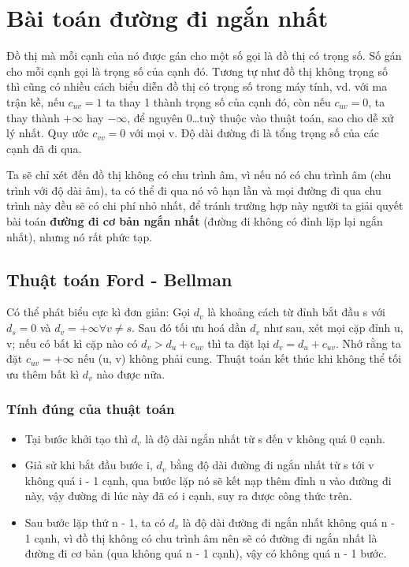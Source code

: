 \section{Bài toán đường đi ngắn nhất}
Đồ thị mà mỗi cạnh của nó được gán cho một số gọi là đồ thị có trọng số. Số gán cho mỗi cạnh gọi là trọng số của cạnh đó. Tương tự như đồ thị không trọng số thì cũng có nhiều cách biểu diễn đồ thị có trọng số trong máy tính, vd. với ma trận kề, nếu $c_{uv} = 1$ ta thay 1 thành trọng số của cạnh đó, còn nếu $c_{uv} = 0$, ta thay thành $+\infty$ hay $-\infty$, để nguyên 0\dots tuỳ thuộc vào thuật toán, sao cho dễ xử lý nhất. Quy ước $c_{vv} = 0$ với mọi v. Độ dài đường đi là tổng trọng số của các cạnh đã đi qua.

Ta sẽ chỉ xét đến đồ thị không có chu trình âm, vì nếu nó có chu trình âm (chu trình với độ dài âm), ta có thể đi qua nó vô hạn lần và mọi đường đi qua chu trình này đều sẽ có chi phí nhỏ nhất, để tránh trường hợp này người ta giải quyết bài toán \textbf{đường đi cơ bản ngắn nhất} (đường đi không có đỉnh lặp lại ngắn nhất), nhưng nó rất phức tạp.

\subsection{Thuật toán Ford - Bellman}
Có thể phát biểu cực kì đơn giản: Gọi $d_v$ là khoảng cách từ đỉnh bắt đầu s với $d_s=0$ và $d_v=+\infty\forall v\neq s$. Sau đó tối ưu hoá dần $d_v$ như sau, xét mọi cặp đỉnh u, v; nếu có bất kì cặp nào có $d_v>d_u+c_{uv}$ thì ta đặt lại $d_v=d_u+c_{uv}$. Nhớ rằng ta đặt $c_{uv}=+\infty$ nếu (u, v) không phải cung. Thuật toán kết thúc khi không thể tối ưu thêm bất kì $d_v$ nào được nữa.

\subsubsection{Tính đúng của thuật toán}
\begin{itemize}
    \item Tại bước khởi tạo thì $d_v$ là độ dài ngắn nhất từ s đến v không quá 0 cạnh.
    \item Giả sử khi bắt đầu bước i, $d_v$ bằng độ dài đường đi ngắn nhất từ s tới v không quá i - 1 cạnh, qua bước lặp nó sẽ kết nạp thêm đỉnh u vào đường đi này, vậy đường đi lúc này đã có i cạnh, suy ra được công thức trên.
    \item Sau bước lặp thứ n - 1, ta có $d_v$ là độ dài đường đi ngắn nhất không quá n - 1 cạnh, vì đồ thị không có chu trình âm nên sẽ có đường đi ngắn nhất là đường đi cơ bản (qua không quá n - 1 cạnh), vậy có không quá n - 1 bước.
\end{itemize}

